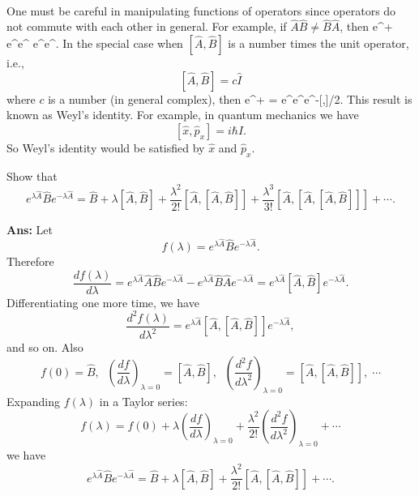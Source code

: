 \paragraph{}
One must be careful in manipulating functions of operators since operators do not commute with each other in general. For example,
if $\hat{A}\hat{B} \neq \hat{B}\hat{A}$, then
\be
e^{+} \neq e^{}e^{} \neq e^{}e^{}.
\ee
In the special case when $[\hat{A}, \hat{B}]$ is a number times the unit operator, i.e.,
\[ [\hat{A},\hat{B}] = c \hat{I} \]
where $c$ is a number (in general complex), then
\be
e^{+} = e^{}e^{}e^{-[,]/2}.
\ee
This result is known as Weyl's identity. For example, in quantum mechanics we have
\[ [\hat{x},\hat{p}_x]=i\hbar \hat{I}. \]
So Weyl's identity would be satisfied by $\hat x$ and $\hat{p}_x$.


\vspace{5 mm}

Show that
\begin{equation}
e^{\lambda \hat{A}}\hat{B} e^{-\lambda \hat{A}} = \hat{B} + \lambda [\hat{A},\hat{B}] +\frac{\lambda^2}{2!}[\hat{A},[\hat{A},\hat{B}]]
+ \frac{\lambda^3}{3!}[\hat{A},[\hat{A},[\hat{A},\hat{B}]]]+ \cdots .
\end{equation}

\vspace{3 mm}
\noindent 
{\bf Ans:}\newline
Let
\[ f(\lambda)= e^{\lambda \hat{A}}\hat{B} e^{-\lambda \hat{A}}.\]
Therefore
\[
\frac{df(\lambda)}{d\lambda}= e^{\lambda \hat{A}}\hat{A}\hat{B} e^{-\lambda \hat{A}} - 
e^{\lambda \hat{A}}\hat{B}\hat{A} e^{-\lambda \hat{A}} = e^{\lambda \hat{A}}[\hat{A},\hat{B}] e^{-\lambda \hat{A}}.
\]
Differentiating one more time, we have
\[
\frac{d^2f(\lambda)}{d\lambda^2} = e^{\lambda \hat{A}}[\hat{A},[\hat{A},\hat{B}]] e^{-\lambda \hat{A}},
\]
and so on. Also
\[
f(0)=\hat{B},\;\; \left( \frac{df}{d\lambda}\right)_{\lambda = 0} =[\hat{A},\hat{B}], \;\;
\left(\frac{d^2f}{d\lambda^2}\right)_{\lambda =0} = [\hat{A},[\hat{A},\hat{B}]], \; \cdots 
\]
Expanding $f(\lambda)$ in a Taylor series:
\[
f(\lambda)=f(0) + \lambda \left( \frac{df}{d\lambda}\right)_{\lambda = 0} + 
\frac{\lambda^2}{2!} \left(\frac{d^2f}{d\lambda^2}\right)_{\lambda =0}+ \cdots
\]
we have
\[
e^{\lambda \hat{A}}\hat{B} e^{-\lambda \hat{A}} = \hat{B} + \lambda [\hat{A},\hat{B}] +\frac{\lambda^2}{2!}[\hat{A},[\hat{A},\hat{B}]]
+  \cdots .
\]



